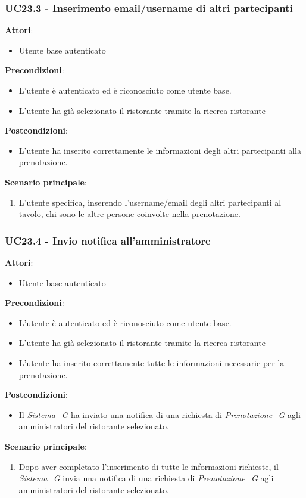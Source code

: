 \subsubsection{UC23.3 - Inserimento email/username di altri partecipanti}\label{usecase:23_3}
\textbf{Attori}:
\begin{itemize}
    \item Utente base autenticato
\end{itemize}
\textbf{Precondizioni}:
\begin{itemize}
    \item L'utente è autenticato ed è riconosciuto come utente base.
    \item L'utente ha già selezionato il ristorante tramite la ricerca ristorante 
\end{itemize}
\textbf{Postcondizioni}:
\begin{itemize}
    \item L'utente ha inserito correttamente le informazioni degli altri partecipanti alla prenotazione.
\end{itemize}
\textbf{Scenario principale}:
\begin{enumerate}
    \item L'utente specifica, inserendo l'username/email degli altri partecipanti al tavolo, chi sono le altre persone coinvolte nella prenotazione.
\end{enumerate}


\subsubsection{UC23.4 - Invio notifica all'amministratore
}\label{usecase:23_4}
\textbf{Attori}:
\begin{itemize}
    \item Utente base autenticato
\end{itemize}
\textbf{Precondizioni}:
\begin{itemize}
    \item L'utente è autenticato ed è riconosciuto come utente base.
    \item L'utente ha già selezionato il ristorante tramite la ricerca ristorante 
    \item L'utente ha inserito correttamente tutte le informazioni necessarie per la prenotazione.
\end{itemize}
\textbf{Postcondizioni}:
\begin{itemize}
    \item Il \textit{Sistema_G} ha inviato una notifica di una richiesta di \textit{Prenotazione_G} agli amministratori del ristorante selezionato.
\end{itemize}
\textbf{Scenario principale}:
\begin{enumerate}
    \item Dopo aver completato l'inserimento di tutte le informazioni richieste, il \textit{Sistema_G} invia una notifica di una richiesta di \textit{Prenotazione_G} agli amministratori del ristorante selezionato.
\end{enumerate}



\newpage